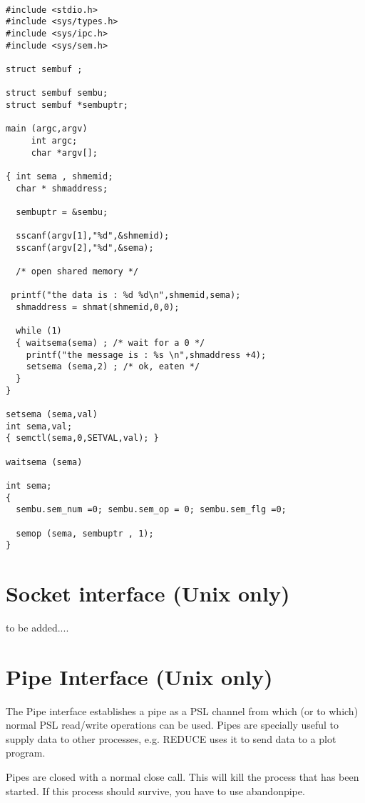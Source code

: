 \begin{verbatim}

#include <stdio.h>
#include <sys/types.h>
#include <sys/ipc.h>
#include <sys/sem.h>

struct sembuf ;

struct sembuf sembu;
struct sembuf *sembuptr;

main (argc,argv)
     int argc;
     char *argv[];

{ int sema , shmemid;
  char * shmaddress;

  sembuptr = &sembu;

  sscanf(argv[1],"%d",&shmemid);
  sscanf(argv[2],"%d",&sema);

  /* open shared memory */

 printf("the data is : %d %d\n",shmemid,sema);
  shmaddress = shmat(shmemid,0,0);

  while (1)
  { waitsema(sema) ; /* wait for a 0 */
    printf("the message is : %s \n",shmaddress +4);
    setsema (sema,2) ; /* ok, eaten */
  }
}

setsema (sema,val)
int sema,val;
{ semctl(sema,0,SETVAL,val); }

waitsema (sema)

int sema;
{ 
  sembu.sem_num =0; sembu.sem_op = 0; sembu.sem_flg =0;

  semop (sema, sembuptr , 1);
}
\end{verbatim}

\section{Socket interface (Unix only)}

to be added....

\section{Pipe Interface (Unix only)}

The Pipe interface establishes a pipe as a PSL channel from which
(or to which) normal PSL read/write operations can be used.
Pipes are specially useful to supply data to other processes, e.g.
REDUCE uses it to send data to a plot program.
\\


Pipes are closed with a normal close call. This will kill the process
that has been started. If this process should survive, you have to use
abandonpipe.
\\

